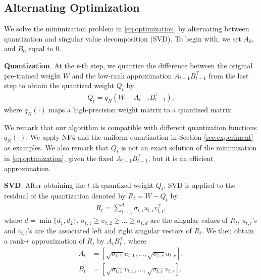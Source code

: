 

\subsection{Alternating Optimization}
\label{sec:alternating_optimization}
We solve the minimization problem in \eqref{eq:optimization} by alternating between quantization and singular value decomposition (SVD). To begin with, we set $A_0$, and $B_0$ equal to 0.

\noindent \textbf{Quantization}. At the $t$-th step, we quantize the difference between the original pre-trained weight $W$ and the low-rank approximation $A_{t-1}B_{t-1}^{\top}$ from the last step to obtain the quantized weight $Q_{t}$ by 
\begin{align}
\label{eq:quant_method}
    Q_t = q_N(W - A_{t-1}B_{t-1}^{\top}),
\end{align}
where $q_N(\cdot)$ maps a high-precision weight matrix to a quantized matrix.

We remark that our algorithm is compatible with different quantization functions $q_N(\cdot)$. We apply NF4 and the uniform quantization in Section \ref{sec:experiment} as examples. We also remark that $Q_t$ is not an exact solution of the minimization in \eqref{eq:optimization}, given the fixed $A_{t-1}B_{t-1}^{\top}$, but it is an efficient approximation.

\noindent \textbf{SVD}. After obtaining the $t$-th quantized weight $Q_t$, SVD is applied to the residual of the quantization denoted by $R_t = W - Q_t$ by
\begin{align}\label{eq:residual}
R_t =\sum_{i=1}^d\sigma_{t, i} u_{t, i} v_{t,i}^{\top},
\end{align}
where $d = \min\{d_1,d_2\}$, $\sigma_{t, 1} \geq \sigma_{t, 2} \geq ... \geq \sigma_{t, d}$ are the singular values of $R_t$, $u_{t, i}$'s and $v_{t, i}$'s are the associated left and right singular vectors of $R_t$. We then obtain a rank-$r$ approximation of $R_t$ by $A_{t}B_{t}^{\top}$, where
\begin{align}
\label{eq:svd}
A_t &= [\sqrt{\sigma_{t, 1}} u_{t, 1},...,\sqrt{\sigma_{t, r}}u_{t, r}],\nonumber\\
B_t &= [\sqrt{\sigma_{t, 1}} v_{t, 1},...,\sqrt{\sigma_{t, r}}v_{t, r}].
\end{align}

